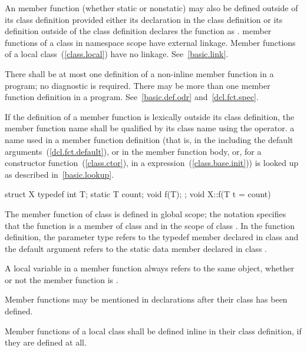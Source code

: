 \pnum
An  member function (whether static or nonstatic) may
also be defined outside of its class definition provided either its
declaration in the class definition or its definition outside of the
class definition declares the function as .
\enternote
member functions of a class in namespace scope have external linkage.
Member functions of a local class~(\ref{class.local}) have no linkage.
See~\ref{basic.link}.
\exitnote

\pnum
There shall be at most one definition of a non-inline member function in
a program; no diagnostic is required. There may be more than one
 member function definition in a program.
See~\ref{basic.def.odr} and~\ref{dcl.fct.spec}.

\pnum
{}%
If the definition of a member function is lexically outside its class
definition, the member function name shall be qualified by its class
name using the \tcode{::} operator.
\enternote
a name used in a member function definition (that is, in the
 including the default
arguments~(\ref{dcl.fct.default}), or in the member function body,
or, for a constructor function~(\ref{class.ctor}), in a
 expression~(\ref{class.base.init}))
is looked up as described in~\ref{basic.lookup}.
\exitnote
\enterexample

\begin{codeblock}
struct X {
	typedef int T;
	static T count;
	void f(T);
};
void X::f(T t = count) { }
\end{codeblock}

The member function  of class  is defined in global
scope; the notation  specifies that the function 
is a member of class  and in the scope of class . In
the function definition, the parameter type  refers to the
typedef member  declared in class  and the default
argument  refers to the static data member 
declared in class .
\exitexample

\pnum
A  local variable in a member function always refers to
the same object, whether or not the member function is .

\pnum
Member functions may be mentioned in  declarations
after their class has been defined.

\pnum
{}%
Member functions of a local class shall be defined inline in their class
definition, if they are defined at all.

